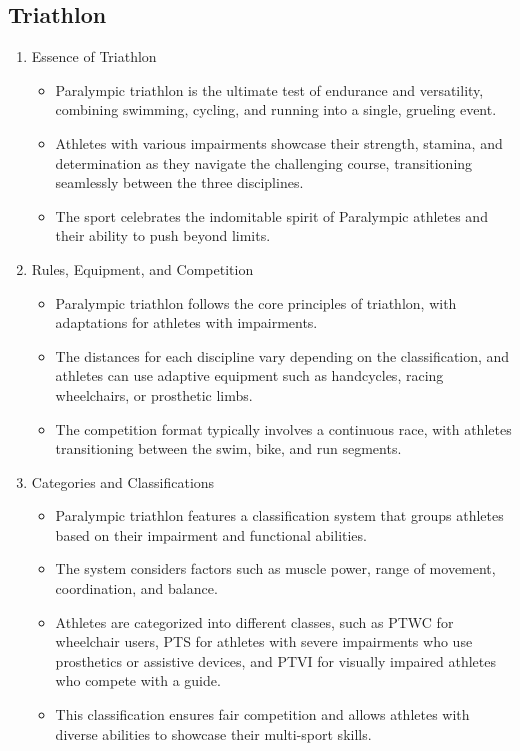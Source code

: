 \subsection{Triathlon}

\begin{enumerate}

\item Essence of Triathlon
    \begin{itemize}
    \item Paralympic triathlon is the ultimate test of endurance and versatility, combining swimming, cycling, and running into a single, grueling event. 
    \item Athletes with various impairments showcase their strength, stamina, and determination as they navigate the challenging course, transitioning seamlessly between the three disciplines. 
    \item The sport celebrates the indomitable spirit of Paralympic athletes and their ability to push beyond limits.
    \end{itemize}

\item Rules, Equipment, and Competition
    \begin{itemize}
    \item Paralympic triathlon follows the core principles of triathlon, with adaptations for athletes with impairments. 
    \item The distances for each discipline vary depending on the classification, and athletes can use adaptive equipment such as handcycles, racing wheelchairs, or prosthetic limbs. 
    \item The competition format typically involves a continuous race, with athletes transitioning between the swim, bike, and run segments. 
    \end{itemize}

\item Categories and Classifications
    \begin{itemize}
    \item Paralympic triathlon features a classification system that groups athletes based on their impairment and functional abilities. 
    \item The system considers factors such as muscle power, range of movement, coordination, and balance. 
    \item Athletes are categorized into different classes, such as PTWC for wheelchair users, PTS for athletes with severe impairments who use prosthetics or assistive devices, and PTVI for visually impaired athletes who compete with a guide. 
    \item This classification ensures fair competition and allows athletes with diverse abilities to showcase their multi-sport skills.
    \end{itemize}

\end{enumerate}